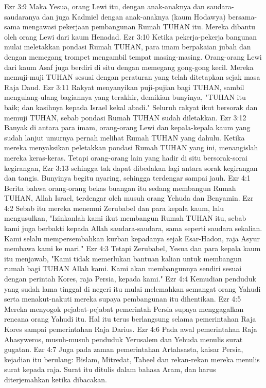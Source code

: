Ezr 3:9  Maka Yesua, orang Lewi itu, dengan anak-anaknya dan saudara-saudaranya dan juga Kadmiel dengan anak-anaknya (kaum Hodawya) bersama-sama mengawasi pekerjaan pembangunan Rumah TUHAN itu. Mereka dibantu oleh orang Lewi dari kaum Henadad.
Ezr 3:10  Ketika pekerja-pekerja bangunan mulai meletakkan pondasi Rumah TUHAN, para imam berpakaian jubah dan dengan memegang trompet mengambil tempat masing-masing. Orang-orang Lewi dari kaum Asaf juga berdiri di situ dengan memegang gong-gong kecil. Mereka memuji-muji TUHAN sesuai dengan peraturan yang telah ditetapkan sejak masa Raja Daud.
Ezr 3:11  Rakyat menyanyikan puji-pujian bagi TUHAN, sambil mengulang-ulang bagiannya yang terakhir, demikian bunyinya, "TUHAN itu baik; dan kasihnya kepada Israel kekal abadi." Seluruh rakyat ikut bersorak dan memuji TUHAN, sebab pondasi Rumah TUHAN sudah diletakkan.
Ezr 3:12  Banyak di antara para imam, orang-orang Lewi dan kepala-kepala kaum yang sudah lanjut umurnya pernah melihat Rumah TUHAN yang dahulu. Ketika mereka menyaksikan peletakkan pondasi Rumah TUHAN yang ini, menangislah mereka keras-keras. Tetapi orang-orang lain yang hadir di situ bersorak-sorai kegirangan,
Ezr 3:13  sehingga tak dapat dibedakan lagi antara sorak kegirangan dan tangis. Bunyinya begitu nyaring, sehingga terdengar sampai jauh.
Ezr 4:1  Berita bahwa orang-orang bekas buangan itu sedang membangun Rumah TUHAN, Allah Israel, terdengar oleh musuh orang Yehuda dan Benyamin.
Ezr 4:2  Sebab itu mereka menemui Zerubabel dan para kepala kaum, lalu mengusulkan, "Izinkanlah kami ikut membangun Rumah TUHAN itu, sebab kami juga berbakti kepada Allah saudara-saudara, sama seperti saudara sekalian. Kami selalu mempersembahkan kurban kepadanya sejak Esar-Hadon, raja Asyur membawa kami ke mari."
Ezr 4:3  Tetapi Zerubabel, Yesua dan para kepala kaum itu menjawab, "Kami tidak memerlukan bantuan kalian untuk membangun rumah bagi TUHAN Allah kami. Kami akan membangunnya sendiri sesuai dengan perintah Kores, raja Persia, kepada kami."
Ezr 4:4  Kemudian penduduk yang sudah lama tinggal di negeri itu mulai melemahkan semangat orang Yahudi serta menakut-nakuti mereka supaya pembangunan itu dihentikan.
Ezr 4:5  Mereka menyogok pejabat-pejabat pemerintah Persia supaya menggagalkan rencana orang Yahudi itu. Hal itu terus berlangsung selama pemerintahan Raja Kores sampai pemerintahan Raja Darius.
Ezr 4:6  Pada awal pemerintahan Raja Ahasyweros, musuh-musuh penduduk Yerusalem dan Yehuda menulis surat gugatan.
Ezr 4:7  Juga pada zaman pemerintahan Artahsasta, kaisar Persia, kejadian itu berulang: Bislam, Mitredat, Tabeel dan rekan-rekan mereka menulis surat kepada raja. Surat itu ditulis dalam bahasa Aram, dan harus diterjemahkan ketika dibacakan.
